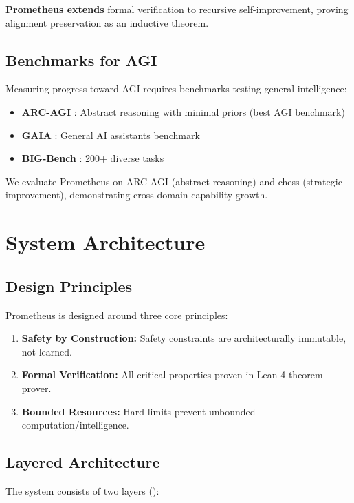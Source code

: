 \documentclass[11pt,letterpaper]{article}
\begin{document}
\textbf{Prometheus extends} formal verification to recursive self-improvement, proving alignment preservation as an inductive theorem.

\subsection{Benchmarks for AGI}

Measuring progress toward AGI requires benchmarks testing general intelligence:
\begin{itemize}
\item \textbf{ARC-AGI} \citep{chollet2019measure}: Abstract reasoning with minimal priors (best AGI benchmark)
\item \textbf{GAIA} \citep{mialon2023gaia}: General AI assistants benchmark
\item \textbf{BIG-Bench} \citep{srivastava2022beyond}: 200+ diverse tasks
\end{itemize}

We evaluate Prometheus on ARC-AGI (abstract reasoning) and chess (strategic improvement), demonstrating cross-domain capability growth.

\section{System Architecture}
\label{sec:architecture}

\subsection{Design Principles}

Prometheus is designed around three core principles:

\begin{enumerate}
\item \textbf{Safety by Construction:} Safety constraints are architecturally immutable, not learned.
\item \textbf{Formal Verification:} All critical properties proven in Lean 4 theorem prover.
\item \textbf{Bounded Resources:} Hard limits prevent unbounded computation/intelligence.
\end{enumerate}

\subsection{Layered Architecture}

The system consists of two layers ():
\end{document}
